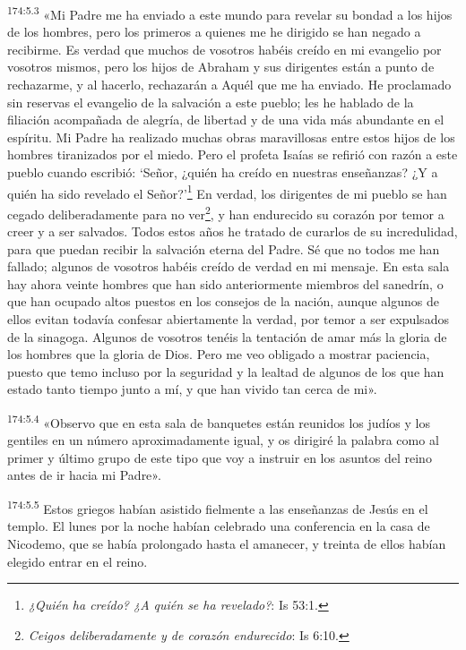 \par 
\textsuperscript{174:5.3} «Mi Padre me ha enviado a este mundo para revelar su bondad a los hijos de los hombres, pero los primeros a quienes me he dirigido se han negado a recibirme. Es verdad que muchos de vosotros habéis creído en mi evangelio por vosotros mismos, pero los hijos de Abraham y sus dirigentes están a punto de rechazarme, y al hacerlo, rechazarán a Aquél que me ha enviado. He proclamado sin reservas el evangelio de la salvación a este pueblo; les he hablado de la filiación acompañada de alegría, de libertad y de una vida más abundante en el espíritu. Mi Padre ha realizado muchas obras maravillosas entre estos hijos de los hombres tiranizados por el miedo. Pero el profeta Isaías se refirió con razón a este pueblo cuando escribió: `Señor, ¿quién ha creído en nuestras enseñanzas? ¿Y a quién ha sido revelado el Señor?'\footnote{\textit{¿Quién ha creído? ¿A quién se ha revelado?}: Is 53:1.} En verdad, los dirigentes de mi pueblo se han cegado deliberadamente para no ver\footnote{\textit{Ceigos deliberadamente y de corazón endurecido}: Is 6:10.}, y han endurecido su corazón por temor a creer y a ser salvados. Todos estos años he tratado de curarlos de su incredulidad, para que puedan recibir la salvación eterna del Padre. Sé que no todos me han fallado; algunos de vosotros habéis creído de verdad en mi mensaje. En esta sala hay ahora veinte hombres que han sido anteriormente miembros del sanedrín, o que han ocupado altos puestos en los consejos de la nación, aunque algunos de ellos evitan todavía confesar abiertamente la verdad, por temor a ser expulsados de la sinagoga. Algunos de vosotros tenéis la tentación de amar más la gloria de los hombres que la gloria de Dios. Pero me veo obligado a mostrar paciencia, puesto que temo incluso por la seguridad y la lealtad de algunos de los que han estado tanto tiempo junto a mí, y que han vivido tan cerca de mi».

\par 
\textsuperscript{174:5.4} «Observo que en esta sala de banquetes están reunidos los judíos y los gentiles en un número aproximadamente igual, y os dirigiré la palabra como al primer y último grupo de este tipo que voy a instruir en los asuntos del reino antes de ir hacia mi Padre».

\par 
\textsuperscript{174:5.5} Estos griegos habían asistido fielmente a las enseñanzas de Jesús en el templo. El lunes por la noche habían celebrado una conferencia en la casa de Nicodemo, que se había prolongado hasta el amanecer, y treinta de ellos habían elegido entrar en el reino.

